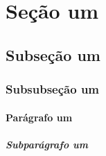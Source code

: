 \documentclass{article}
\begin{document}
\tableofcontents

\section{Seção um}

\subsection{Subseção um}

\subsubsection{Subsubseção um}

\paragraph{Parágrafo um}

\subparagraph{Subparágrafo um}
\end{document}
